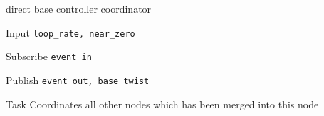 \begin{frame}{direct base controller coordinator}
	\begin{alertblock}{Input}
	\texttt{loop\_rate, near\_zero}
    \end{alertblock}
    
    \begin{alertblock}{Subscribe}
	\texttt{event\_in}
    \end{alertblock}
    
    \begin{alertblock}{Publish}
	\texttt{event\_out, base\_twist}
    \end{alertblock}
    
    \begin{alertblock}{Task}
    Coordinates all other nodes which has been merged into this node
    \end{alertblock}
\end{frame}

